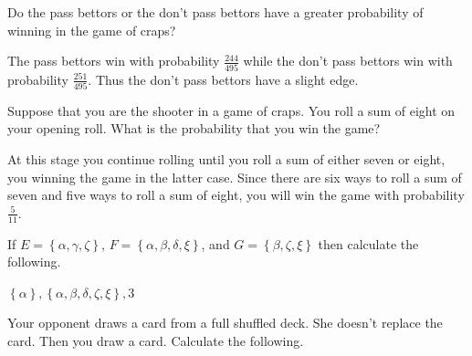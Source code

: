 \documentclass[answers,12pt]{exam}
\begin{document}
\begin{questions}
\question Do the pass bettors or the don't pass bettors have
a greater probability of winning in the game of craps?
\begin{solution} The pass bettors win with probability
$\frac{244}{495}$ while the don't pass bettors win with probability
$\frac{251}{495}$. Thus the don't pass bettors have a slight edge.
\end{solution}

\question Suppose that you are the shooter in a game of craps.
You roll a sum of eight on your opening
roll. What is the probability that you win the game?
\begin{solution} At this stage you continue rolling until
you roll a sum of either seven or eight, you winning the game
in the latter case. Since there are six ways to roll a sum of
seven and five ways to roll a sum of eight,
you will win the game with probability $\frac{5}{11}$.
\end{solution}

\question If $E=\left\{\alpha,\gamma,\zeta\right\}$,
$F=\left\{\alpha,\beta,\delta,\xi\right\}$, and
$G=\left\{\beta,\zeta,\xi\right\}$ then calculate the following.
\begin{solution} $\left\{\alpha\right\},\left\{
\alpha,\beta,\delta,\zeta,\xi\right\},3$
\end{solution}

\question Your opponent draws a card from a full shuffled deck.
She doesn't replace the card.
Then you draw a card. Calculate the following.
\end{questions}
\end{document}

